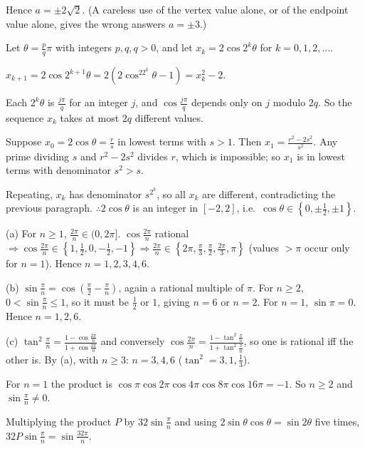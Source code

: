   Hence $a = \pm2\sqrt{2}$. (A careless use of the vertex value alone, or of the endpoint value alone, gives the wrong
  answers $a = \pm3$.)
\item Let $\theta = \frac{p}{q}\pi$ with integers $p, q, q > 0$, and let $x_k = 2\cos2^k\theta$ for $k = 0, 1, 2,
  \ldots$.

  $x_{k + 1} = 2\cos2^{k + 1}\theta = 2\left(2\cos^22^k\theta - 1\right) = x_k^2 - 2$.

  Each $2^k\theta$ is $\frac{j\pi}{q}$ for an integer $j$, and $\cos\frac{j\pi}{q}$ depends only on $j$ modulo $2q$.
  So the sequence $x_k$ takes at most $2q$ different values.

  Suppose $x_0 = 2\cos\theta = \frac{r}{s}$ in lowest terms with $s > 1$. Then $x_1 = \frac{r^2 - 2s^2}{s^2}$. Any
  prime dividing $s$ and $r^2 - 2s^2$ divides $r$, which is impossible; so $x_1$ is in lowest terms with denominator
  $s^2 > s$.

  Repeating, $x_k$ has denominator $s^{2^k}$, so all $x_k$ are different, contradicting the previous paragraph.
  $\therefore 2\cos\theta$ is an integer in $[-2, 2]$, i.e.\ $\cos\theta\in\left\{0, \pm\frac{1}{2},
  \pm1\right\}$.

  (a) For $n\ge 1$, $\frac{2\pi}{n}\in(0, 2\pi]$. $\cos\frac{2\pi}{n}$ rational $\Rightarrow\cos\frac{2\pi}{n}\in
  \left\{1, \frac{1}{2}, 0, -\frac{1}{2}, -1\right\}\Rightarrow\frac{2\pi}{n}\in\left\{2\pi, \frac{\pi}{3},
  \frac{\pi}{2}, \frac{2\pi}{3}, \pi\right\}$ (values $> \pi$ occur only for $n = 1$). Hence $n = 1, 2, 3, 4, 6$.

  (b) $\sin\frac{\pi}{n} = \cos\left(\frac{\pi}{2} - \frac{\pi}{n}\right)$, again a rational multiple of $\pi$. For
  $n\ge 2$, $0 < \sin\frac{\pi}{n}\le 1$, so it must be $\frac{1}{2}$ or $1$, giving $n = 6$ or $n = 2$. For $n = 1$,
  $\sin\pi = 0$. Hence $n = 1, 2, 6$.

  (c) $\tan^2\frac{\pi}{n} = \frac{1 - \cos\frac{2\pi}{n}}{1 + \cos\frac{2\pi}{n}}$ and conversely
  $\cos\frac{2\pi}{n} = \frac{1 - \tan^2\frac{\pi}{n}}{1 + \tan^2\frac{\pi}{n}}$, so one is rational iff the other
  is. By (a), with $n\ge 3$: $n = 3, 4, 6$ ($\tan^2 = 3, 1, \frac{1}{3}$).
\item For $n = 1$ the product is $\cos\pi\cos2\pi\cos4\pi\cos8\pi\cos16\pi = -1$. So $n\ge 2$ and $\sin\frac{\pi}{n}
  \neq 0$.

  Multiplying the product $P$ by $32\sin\frac{\pi}{n}$ and using $2\sin\theta\cos\theta = \sin2\theta$ five times,
  $32P\sin\frac{\pi}{n} = \sin\frac{32\pi}{n}$.

